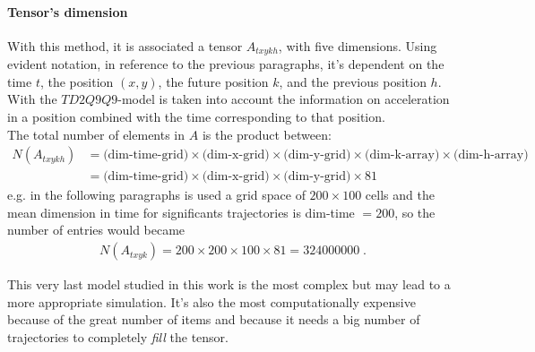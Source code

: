 \documentclass[class=article, crop=false]{standalone}
\begin{document}
\paragraph{Tensor's dimension}
With this method, it is associated a tensor $A_{t x y k h}$, with five dimensions.
Using evident notation, in reference to the previous paragraphs, it's dependent on the time $t$, the position $(x, y)$, the future position $k$, and the previous position $h$.
With the $TD2Q9Q9$-model is taken into account the information on acceleration in a position combined with the time corresponding to that position.
\\The total number of elements in $A$ is the product between:
\begin{equation*}
\begin{split}
N(A_{t xykh}) &= \mbox{(dim-time-grid)} \times \mbox{(dim-x-grid)} \times \mbox{(dim-y-grid)} \times \mbox{(dim-k-array)} \times \mbox{(dim-h-array)} \\
& = \mbox{(dim-time-grid)} \times \mbox{(dim-x-grid)} \times \mbox{(dim-y-grid)} \times 81
\end{split}
\end{equation*}
e.g. in the following paragraphs is used a grid space of $200\times100$ cells and the mean dimension in time for significants trajectories is dim-time $ = 200$, so the number of entries would became 
\begin{equation*}
\begin{split}
N(A_{t xyk})=200 \times 200\times100\times 81 = 324000000 \; .
\end{split}
\end{equation*}


This very last model studied in this work is the most complex but may lead to a more appropriate simulation.
It's also the most computationally expensive because of the great number of items and 
because it needs a big number of trajectories to completely \emph{fill} the tensor.
\end{document}
